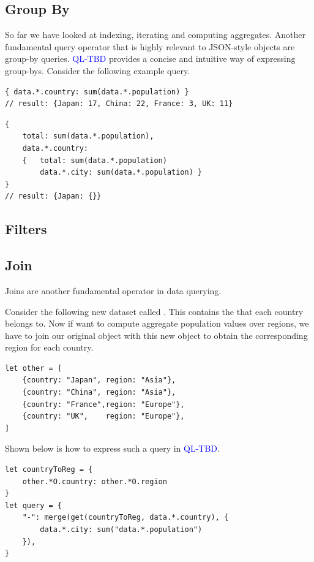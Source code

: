 \documentclass[runningheads]{llncs}
\newcommand{\lang}{\textcolor{blue}{QL-TBD}}
\begin{document}
\subsection{Group By}
So far we have looked at indexing, iterating and computing aggregates.
Another fundamental query operator that is highly relevant to JSON-style
objects are group-by queries.
\lang{} provides a concise and intuitive way of expressing group-bys.
Consider the following example query.

\begin{lstlisting}[style=JavaScript, columns=flexible, numbers=none]
{ data.*.country: sum(data.*.population) }
// result: {Japan: 17, China: 22, France: 3, UK: 11}
\end{lstlisting}

\begin{lstlisting}[style=JavaScript, columns=flexible, numbers=none]
{ 
    total: sum(data.*.population),
    data.*.country:
    {   total: sum(data.*.population)
        data.*.city: sum(data.*.population) }
}
// result: {Japan: {}}
\end{lstlisting}


\subsection{Filters}
\subsection{Join}
Joins are another fundamental operator in data querying.

Consider the following new dataset called .
This contains the  that each country belongs to.
Now if want to compute aggregate population values over regions, we
have to join our original  object with this new object
to obtain the corresponding region for each country.

\begin{lstlisting}[style=JavaScript]
let other = [
    {country: "Japan", region: "Asia"},
    {country: "China", region: "Asia"},
    {country: "France",region: "Europe"},
    {country: "UK",    region: "Europe"},
]
\end{lstlisting}

Shown below is how to express such a query in \lang{}.

\begin{lstlisting}[style=JavaScript, columns=flexible]
let countryToReg = {
    other.*O.country: other.*O.region
}
let query = {
    "-": merge(get(countryToReg, data.*.country), {
        data.*.city: sum("data.*.population")
    }),
}
\end{lstlisting}
\end{document}

